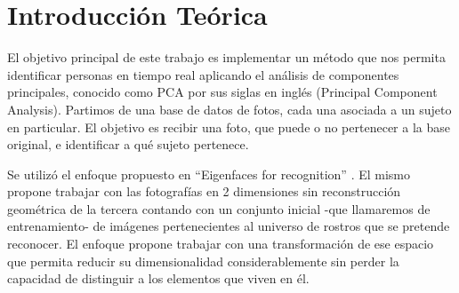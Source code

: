 \section{Introducción Teórica}
%
El objetivo principal de este trabajo es implementar un método que nos permita identificar personas en tiempo real aplicando el 
análisis de componentes principales, conocido como PCA por sus siglas en inglés (Principal Component Analysis).\newline
Partimos de una base de datos de fotos, cada una asociada a un sujeto en particular. El objetivo es recibir una foto, que puede o no pertenecer a la base original, e identificar a qué sujeto pertenece.
\par
Se utilizó el enfoque propuesto en ``Eigenfaces for recognition'' \cite{eigenfaces}. El mismo propone trabajar
con las fotografías en 2 dimensiones sin reconstrucción geométrica de la tercera contando con un conjunto inicial -que 
llamaremos de entrenamiento- de imágenes pertenecientes al universo de rostros que se pretende reconocer. El enfoque propone trabajar 
con una transformación de ese espacio que permita reducir su dimensionalidad considerablemente sin perder la capacidad de distinguir 
a los elementos que viven en él.
